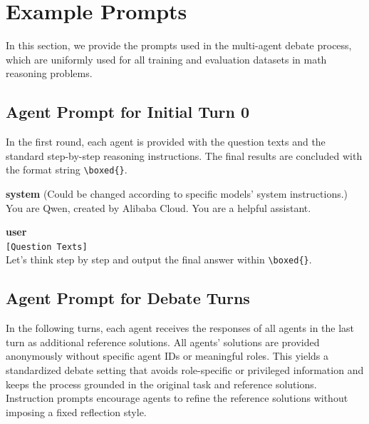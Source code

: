 \documentclass{article}
\theoremstyle{plain}
\theoremstyle{definition}
\theoremstyle{remark}
\begin{document}
\section{Example Prompts}\label{app:prompts}

In this section, we provide the prompts used in the multi-agent debate process, which are uniformly used for all training and evaluation datasets in math reasoning problems.

\subsection{Agent Prompt for Initial Turn 0}

In the first round, each agent is provided with the question texts and the standard step-by-step reasoning instructions. The final results are concluded with the format string \texttt{\textbackslash boxed\{\}}.

\begin{userchat}
\textbf{system} (Could be changed according to specific models' system instructions.) \\
You are Qwen, created by Alibaba Cloud. You are a helpful assistant.

\textbf{user} \\
\texttt{[Question Texts]} \\
Let's think step by step and output the final answer within \texttt{\textbackslash boxed\{\}}.
\end{userchat}

\subsection{Agent Prompt for Debate Turns}

In the following turns, each agent receives the responses of all agents in the last turn as additional reference solutions. All agents' solutions are provided anonymously without specific agent IDs or meaningful roles. This yields a standardized debate setting that avoids role-specific or privileged information and keeps the process grounded in the original task and reference solutions. Instruction prompts encourage agents to refine the reference solutions without imposing a fixed reflection style.
\end{document}
